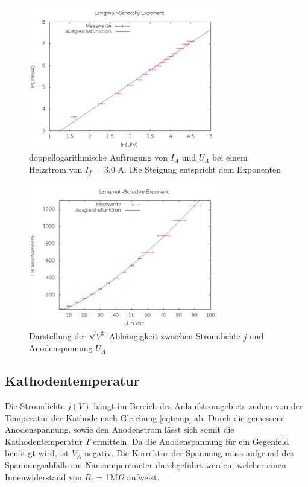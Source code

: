 \begin{figure}[H]
\includegraphics[width=0.75\textwidth]{pics/504b2.png} 
\caption{doppellogarithmische Auftragung von $I_A$ und $U_A$ bei einem Heizstrom von $I_f$ = 3,0 A. Die Steigung entspricht dem Exponenten}
\label{piclang}
\end{figure}
\begin{figure}[H]
 \includegraphics[width=0.75\textwidth]{pics/504b1.png} 
 \caption{Darstellung der $\sqrt{V^3}$-Abhängigkeit zwischen Stromdichte $j$ und Anodenspannung $U_A$}
\end{figure}

\subsection{Kathodentemperatur}
\label{kath}
Die Stromdichte $j(V)$ hängt im Bereich des Anlaufstromgebiets zudem von der Temperatur der Kathode nach Gleichung \eqref{eqtemp} ab.
Durch die gemessene Anodenspannung, sowie den Anodenstrom lässt sich somit die Kathodentemperatur $T$ ermitteln. Da die Anodenspannung
für ein Gegenfeld benötigt wird, ist $V_A$ negativ. Die Korrektur der Spannung muss aufgrund des Spannungsabfalls am Nanoamperemeter
durchgeführt werden, welcher einen Innenwiderstand von $R_i$ = 1M$\Omega$ aufweist.

